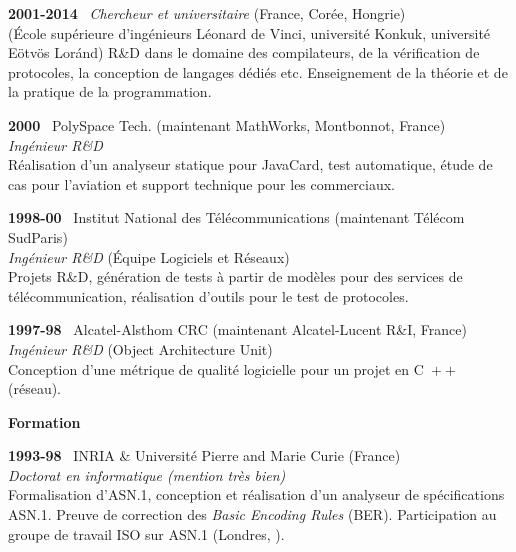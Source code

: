 \documentclass[a4paper,11pt]{article}
\newcommand{\cpp}{\mbox{C \hspace*{-2.5mm} \raise 0.7mm \hbox{${\scriptscriptstyle ++}$}}}
\begin{document}
\bigskip

\noindent\textbf{2001-2014} \ \textsf{\emph{Chercheur et
  universitaire}} (France, Corée, Hongrie)\\ (\textsf{École supérieure
  d'ingénieurs Léonard de Vinci}, \textsf{université Konkuk},
\textsf{université E\"otv\"os Lor\'and}) R\&D dans le domaine des
compilateurs, de la vérification de protocoles, la conception de
langages dédiés etc. Enseignement de la théorie et de la pratique de
la programmation.

\bigskip

\noindent\textbf{2000} \ \textsf{PolySpace Tech.\@} (maintenant
MathWorks, Montbonnot, France)\\ \emph{Ingénieur R\&D}\\ Réalisation
d'un analyseur statique pour JavaCard, test automatique, étude de cas
pour l'aviation et support technique pour les commerciaux.

\bigskip

\noindent\textbf{1998-00} \ \textsf{Institut National des
  Télécommunications} (maintenant Télécom
SudParis)\\ \emph{Ingénieur R\&D} (Équipe Logiciels et
Réseaux)\\ Projets R\&D, génération de tests à partir de modèles pour
des services de télécommunication, réalisation d'outils pour le test
de protocoles.

\bigskip

\noindent\textbf{1997-98} \ \textsf{Alcatel-Alsthom CRC} (maintenant
Alcatel-Lucent R\&I, France)\\ \emph{Ingénieur R\&D} (Object
Architecture Unit)\\ Conception d'une métrique de qualité logicielle
pour un projet en \cpp{} (réseau).

\bigskip
\noindent\textbf{\large Formation}
\bigskip

\noindent\textbf{1993-98} \ \textsf{INRIA \& Université Pierre and
  Marie Curie} (France)\\ \emph{Doctorat en informatique (mention très
bien)}\\ Formalisation d'ASN.1, conception et réalisation d'un
analyseur de spécifications ASN.1. Preuve de correction des
\emph{Basic Encoding Rules} (BER). Participation au groupe de travail
ISO sur ASN.1 (Londres, ).


\newpage
\end{document}

